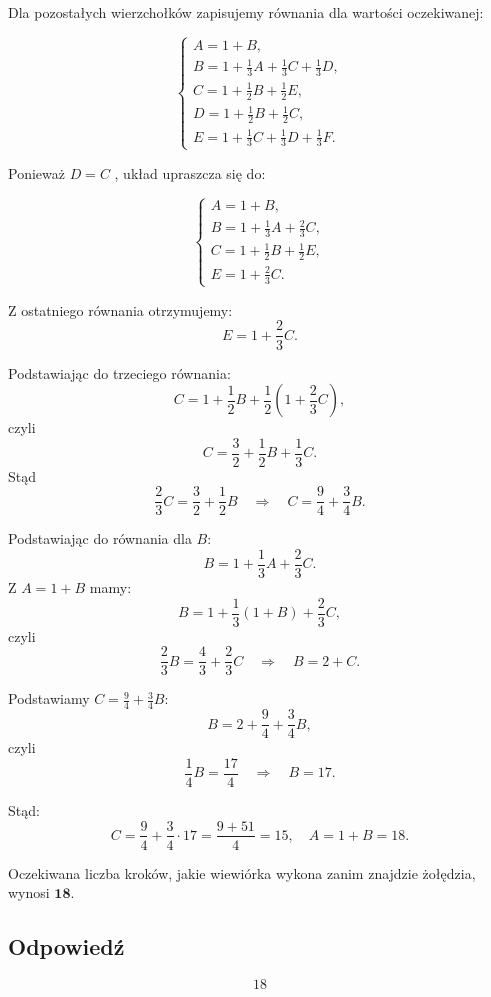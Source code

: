 Dla pozostałych wierzchołków zapisujemy równania dla wartości oczekiwanej:

\[
	\begin{cases}
		A = 1 + B,                                          \\[6pt]
		B = 1 + \frac{1}{3}A + \frac{1}{3}C + \frac{1}{3}D, \\[6pt]
		C = 1 + \frac{1}{2}B + \frac{1}{2}E,                \\[6pt]
		D = 1 + \frac{1}{2}B + \frac{1}{2}C,                \\[6pt]
		E = 1 + \frac{1}{3}C + \frac{1}{3}D + \frac{1}{3}F.
	\end{cases}
\]

Ponieważ \(D = C\) , układ upraszcza się do:

\[
	\begin{cases}
		A = 1 + B,                           \\[6pt]
		B = 1 + \frac{1}{3}A + \frac{2}{3}C, \\[6pt]
		C = 1 + \frac{1}{2}B + \frac{1}{2}E, \\[6pt]
		E = 1 + \frac{2}{3}C.
	\end{cases}
\]

Z ostatniego równania otrzymujemy:
\[
	E = 1 + \frac{2}{3}C.
\]

Podstawiając do trzeciego równania:
\[
	C = 1 + \frac{1}{2}B + \frac{1}{2}\left(1 + \frac{2}{3}C\right),
\]
czyli
\[
	C = \frac{3}{2} + \frac{1}{2}B + \frac{1}{3}C.
\]
Stąd
\[
	\frac{2}{3}C = \frac{3}{2} + \frac{1}{2}B \quad \Rightarrow \quad C = \frac{9}{4} + \frac{3}{4}B.
\]

Podstawiając do równania dla \(B\):
\[
	B = 1 + \frac{1}{3}A + \frac{2}{3}C.
\]
Z \(A = 1 + B\) mamy:
\[
	B = 1 + \frac{1}{3}(1 + B) + \frac{2}{3}C,
\]
czyli
\[
	\frac{2}{3}B = \frac{4}{3} + \frac{2}{3}C \quad \Rightarrow \quad B = 2 + C.
\]

Podstawiamy \(C = \frac{9}{4} + \frac{3}{4}B\):
\[
	B = 2 + \frac{9}{4} + \frac{3}{4}B,
\]
czyli
\[
	\frac{1}{4}B = \frac{17}{4} \quad \Rightarrow \quad B = 17.
\]

Stąd:
\[
	C = \frac{9}{4} + \frac{3}{4} \cdot 17 = \frac{9 + 51}{4} = 15, \quad A = 1 + B = 18.
\]

Oczekiwana liczba kroków, jakie wiewiórka wykona zanim znajdzie żołędzia, wynosi \(\mathbf{18}\).

\subsection*{Odpowiedź}
\[
	\boxed{\text{18}}
\]
